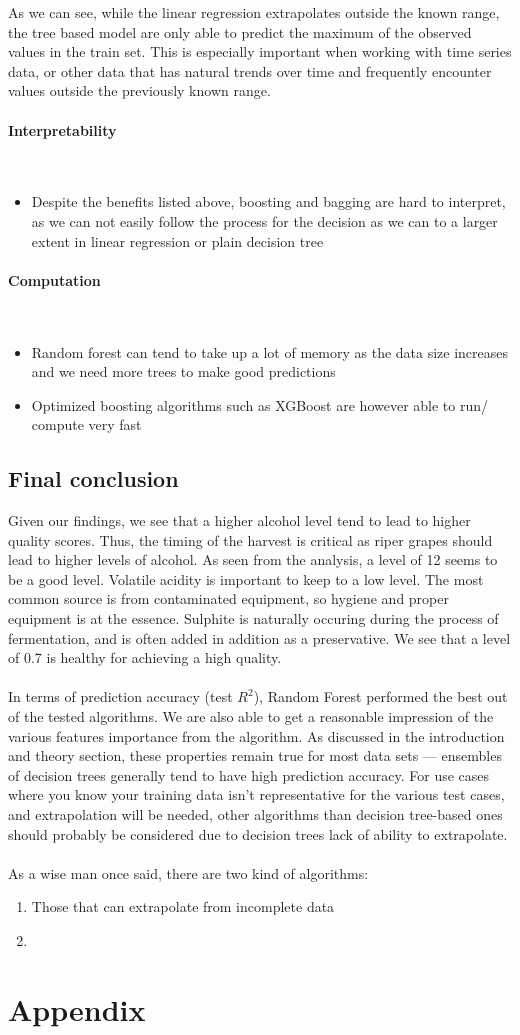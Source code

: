 \documentclass[10pt, a4paper, twocolumn]{article}
\newcommand{\myparagraph}[1]{\paragraph{#1}\mbox{}\\}
\begin{document}
	As we can see, while the linear regression extrapolates outside the known range, the tree based model are only able to predict the maximum of the observed values in the train set. This is especially important when working with time series data, or other data that has natural trends over time and frequently encounter values outside the previously known range.
	\myparagraph{Interpretability}
	\begin{itemize}
		\item Despite the benefits listed above, boosting and bagging are hard to interpret, as we can not easily follow the process for the decision as we can to a larger extent in linear regression or plain decision tree
	\end{itemize}
	\myparagraph{Computation}
	\begin{itemize}
		\item Random forest can tend to take up a lot of memory as the data size increases and we need more trees to make good predictions
		\item Optimized boosting algorithms such as XGBoost are however able to run/ compute very fast
	\end{itemize}
	\subsection{Final conclusion}
		Given our findings, we see that a higher alcohol level tend to lead to higher quality scores. Thus, the timing of the harvest is critical as riper grapes should lead to higher levels of alcohol. As seen from the analysis, a level of 12 seems to be a good level. Volatile acidity is important to keep to a low level. The most common source is from contaminated equipment, so hygiene and proper equipment is at the essence. Sulphite is naturally occuring during the process of fermentation, and is often added in addition as a preservative. We see that a level of 0.7 is healthy for achieving a high quality.\cite{wine1}\cite{wine2}\cite{wine3}\\\\
		
		In terms of prediction accuracy (test $R^2$), Random Forest performed the best out of the tested algorithms. We are also able to get a reasonable impression of the various features importance from the algorithm. As discussed in the introduction and theory section, these properties remain true for most data sets --- ensembles of decision trees generally tend to have high prediction accuracy. For use cases where you know your training data isn't representative for the various test cases, and extrapolation will be needed, other algorithms than decision tree-based ones should probably be considered due to decision trees lack of ability to extrapolate.\\\\
		As a wise man once said, there are two kind of algorithms:\begin{enumerate}
			\item Those that can extrapolate from incomplete data
			\item  
		\end{enumerate}


	
\onecolumn
\section{Appendix}
	
\twocolumn
	
\nocite{*}


\end{document}
